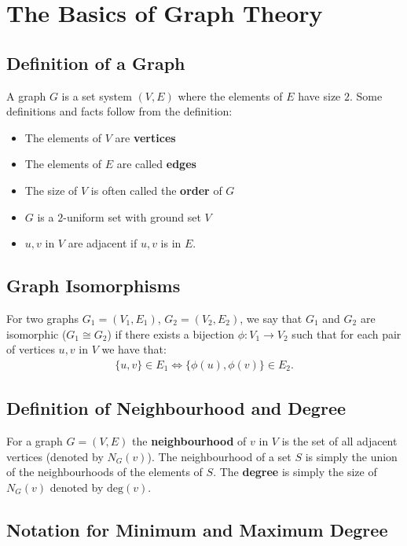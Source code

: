 \documentclass[a4paper, 12pt, twoside]{article}
\begin{document}
\vfill

\section{The Basics of Graph Theory}

\subsection{Definition of a Graph}

A graph $G$ is a set system $(V, E)$ where the elements of $E$ have
size $2$. Some definitions and facts follow from the definition:
\begin{itemize}
  \item The elements of $V$ are \textbf{vertices}
  \item The elements of $E$ are called \textbf{edges}
  \item The size of $V$ is often called the \textbf{order} of $G$
  \item $G$ is a $2$-uniform set with ground set $V$
  \item $u, v$ in $V$ are adjacent if ${u, v}$ is in $E$.
\end{itemize}  

\subsection{Graph Isomorphisms}

For two graphs $G_1 = (V_1, E_1)$, $G_2 = (V_2, E_2)$, we say that
$G_1$ and $G_2$ are isomorphic ($G_1 \cong G_2$) if there exists a
bijection $\phi : V_1 \to V_2$ such that for each pair of vertices
$u, v$ in $V$ we have that: \begin{gather*}
  \{u, v\} \in E_1 \Longleftrightarrow \{\phi(u), \phi(v)\} \in E_2.
\end{gather*}

\subsection{Definition of Neighbourhood and Degree}

For a graph $G = (V, E)$ the \textbf{neighbourhood} of $v$ in $V$ 
is the set of all adjacent vertices (denoted by $N_G(v)$). The
neighbourhood of a set $S$ is simply the union of the neighbourhoods
of the elements of $S$.
The \textbf{degree} is simply the size of $N_G(v)$ denoted 
by $\text{deg}(v)$.

\subsection{Notation for Minimum and Maximum Degree}
\end{document}
